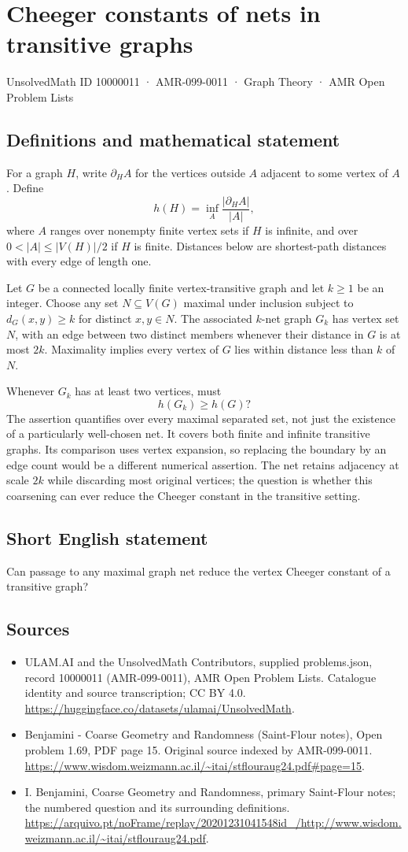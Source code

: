 \documentclass[11pt,a4paper]{article}
\begin{document}
\section*{Cheeger constants of nets in transitive graphs}\label{10000011}
{\small UnsolvedMath ID 10000011 · AMR-099-0011 · Graph Theory · AMR Open Problem Lists}
\subsection{Definitions and mathematical statement}
For a graph $H$, write $\partial_H A$ for the vertices outside $A$ adjacent to some vertex of $A$. Define
\[
h(H)=\inf_A\frac{|\partial_H A|}{|A|},
\]
where $A$ ranges over nonempty finite vertex sets if $H$ is infinite, and over $0<|A|\le |V(H)|/2$ if $H$ is finite. Distances below are shortest-path distances with every edge of length one.

Let $G$ be a connected locally finite vertex-transitive graph and let $k\ge1$ be an integer. Choose any set $N\subseteq V(G)$ maximal under inclusion subject to $d_G(x,y)\ge k$ for distinct $x,y\in N$. The associated $k$-net graph $G_k$ has vertex set $N$, with an edge between two distinct members whenever their distance in $G$ is at most $2k$. Maximality implies every vertex of $G$ lies within distance less than $k$ of $N$.

Whenever $G_k$ has at least two vertices, must
\[
h(G_k)\ge h(G)?
\]
The assertion quantifies over every maximal separated set, not just the existence of a particularly well-chosen net. It covers both finite and infinite transitive graphs. Its comparison uses vertex expansion, so replacing the boundary by an edge count would be a different numerical assertion. The net retains adjacency at scale $2k$ while discarding most original vertices; the question is whether this coarsening can ever reduce the Cheeger constant in the transitive setting.
\subsection{Short English statement}
Can passage to any maximal graph net reduce the vertex Cheeger constant of a transitive graph?
\subsection{Sources}
\begin{itemize}
\item[S1] ULAM.AI and the UnsolvedMath Contributors, supplied problems.json, record 10000011 (AMR-099-0011), AMR Open Problem Lists. Catalogue identity and source transcription; CC BY 4.0.
\url{https://huggingface.co/datasets/ulamai/UnsolvedMath}.
\item[S2] Benjamini - Coarse Geometry and Randomness (Saint-Flour notes), Open problem 1.69, PDF page 15. Original source indexed by AMR-099-0011.
\url{https://www.wisdom.weizmann.ac.il/~itai/stflouraug24.pdf#page=15}.
\item[S3] I. Benjamini, Coarse Geometry and Randomness, primary Saint-Flour notes; the numbered question and its surrounding definitions.
\url{https://arquivo.pt/noFrame/replay/20201231041548id_/http://www.wisdom.weizmann.ac.il/~itai/stflouraug24.pdf}.
\end{itemize}
\end{document}
